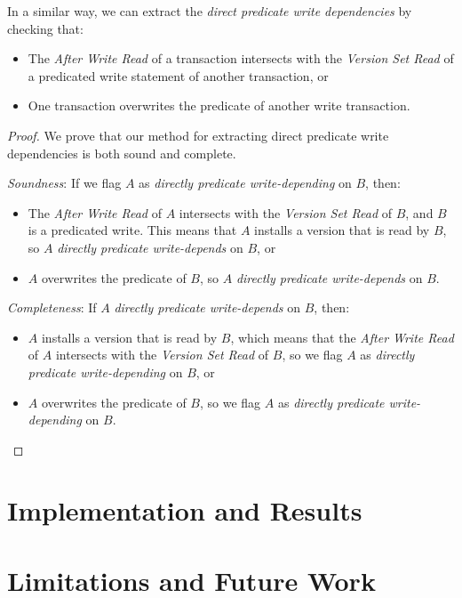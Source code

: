 In a similar way, we can extract the \textit{direct predicate write dependencies} by checking that:
\begin{itemize}
    \item The \textit{After Write Read} of a transaction intersects with the \textit{Version Set Read} of a predicated write statement of another transaction, or
    \item One transaction overwrites the predicate of another write transaction.
\end{itemize}

\begin{proof}
    We prove that our method for extracting direct predicate write dependencies is both sound and complete.

    \textit{Soundness}: If we flag $A$ as \textit{directly predicate write-depending} on $B$, then:
    \begin{itemize}
        \item The \textit{After Write Read} of $A$ intersects with the \textit{Version Set Read} of $B$, and $B$ is a predicated write. This means that $A$ installs a version that is read by $B$, so $A$ \textit{directly predicate write-depends} on $B$, or
        \item $A$ overwrites the predicate of $B$, so $A$ \textit{directly predicate write-depends} on $B$.
    \end{itemize}

    \textit{Completeness}: If $A$ \textit{directly predicate write-depends} on $B$, then:
    \begin{itemize}
        \item $A$ installs a version that is read by $B$, which means that the \textit{After Write Read} of $A$ intersects with the \textit{Version Set Read} of $B$, so we flag $A$ as \textit{directly predicate write-depending} on $B$, or
        \item $A$ overwrites the predicate of $B$, so we flag $A$ as \textit{directly predicate write-depending} on $B$.
    \end{itemize}
\end{proof}

\section{Implementation and Results}


\section{Limitations and Future Work}

